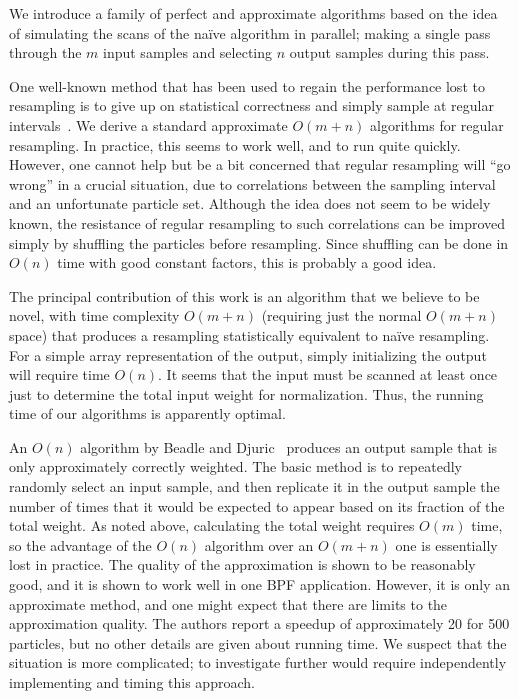 \documentclass[12pt]{article}
\begin{document}
  We introduce a family of perfect and approximate
  algorithms based on the idea of simulating the scans of
  the na\"ive algorithm in parallel; making a single pass
  through the $m$ input samples and selecting $n$ output
  samples during this pass.

  One well-known method that has been used to regain the
  performance lost to resampling is to give up on
  statistical correctness and simply sample at regular
  intervals~\cite{kitagawa}.  We derive a standard
  approximate $O(m + n)$ algorithms for regular resampling.
  In practice, this seems to work well, and to run quite
  quickly.  However, one cannot help but be a bit concerned
  that regular resampling will ``go wrong'' in a crucial
  situation, due to correlations between the sampling
  interval and an unfortunate particle set.  Although the
  idea does not seem to be widely known, the resistance of
  regular resampling to such correlations can be improved
  simply by shuffling the particles before resampling.
  Since shuffling can be done in $O(n)$ time with good
  constant factors, this is probably a good idea.

  The principal contribution of this work is an algorithm
  that we believe to be novel, with time complexity $O(m +
  n)$ (requiring just the normal $O(m + n)$ space) that
  produces a resampling statistically equivalent to na\"ive
  resampling. For a simple array representation of the
  output, simply initializing the output will require time
  $O(n)$.  It seems that the input must be scanned at least
  once just to determine the total input weight for
  normalization.  Thus, the running time of our algorithms
  is apparently optimal.

  An $O(n)$ algorithm by Beadle and Djuric~\cite{recount}
  produces an output sample that is only approximately
  correctly weighted.  The basic method is to repeatedly
  randomly select an input sample, and then replicate it in
  the output sample the number of times that it would be
  expected to appear based on its fraction of the total
  weight.  As noted above, calculating the total weight
  requires $O(m)$ time, so the advantage of the $O(n)$
  algorithm over an $O(m + n)$ one is essentially lost in
  practice.  The quality of the approximation is shown to be
  reasonably good, and it is shown to work well in one BPF
  application.  However, it is only an approximate method,
  and one might expect that there are limits to the
  approximation quality.  The authors report a speedup of
  approximately 20 for 500 particles, but no other details
  are given about running time.  We suspect that the
  situation is more complicated; to investigate further
  would require independently implementing and timing this
  approach.
\end{document}
